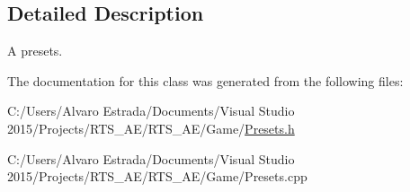 \subsection{Detailed Description}
A presets. 

The documentation for this class was generated from the following files\+:\begin{DoxyCompactItemize}
\item 
C\+:/\+Users/\+Alvaro Estrada/\+Documents/\+Visual Studio 2015/\+Projects/\+R\+T\+S\+\_\+\+A\+E/\+R\+T\+S\+\_\+\+A\+E/\+Game/\hyperlink{_presets_8h}{Presets.\+h}\item 
C\+:/\+Users/\+Alvaro Estrada/\+Documents/\+Visual Studio 2015/\+Projects/\+R\+T\+S\+\_\+\+A\+E/\+R\+T\+S\+\_\+\+A\+E/\+Game/Presets.\+cpp\end{DoxyCompactItemize}
